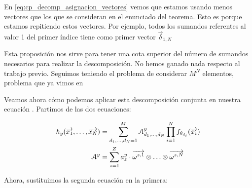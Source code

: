 \begin{observacion}
    En \eqref{eq:cp_decomp_asignacion_vectores} vemos que estamos usando menos vectores que los que se consideran en el enunciado del teorema. Esto es porque estamos repitiendo estos vectores. Por ejemplo, todos los sumandos referentes al valor 1 del primer índice tiene como primer vector $\vec{\delta}_{1, N}$
\end{observacion}

\begin{observacion}
    Esta proposición nos sirve para tener una cota superior del número de sumandos necesarios para realizar la descomposición. No hemos ganado nada respecto al trabajo previo. Seguimos teniendo el problema de considerar $M^N$ elementos, problema que ya vimos en 
\end{observacion}

Veamos ahora cómo podemos aplicar esta descomposición conjunta en nuestra ecuación . Partimos de las dos ecuaciones:

\begin{equation}
\begin{split}
    h_y(\overrightarrow{x_1}, \ldots, \overrightarrow{x_N}) &= \sum_{d_1, \ldots, d_N = 1}^{M} \mathcal{A}^y_{d_1, \ldots, d_N} \prod_{i = 1}^N f_{\theta_{d_i}}(\overrightarrow{x_i}) \\
    \mathcal{A}^y &= \sum_{z = 1}^Z a_z^y \cdot \overrightarrow{\omega^{z, 1}} \otimes \ldots \otimes \overrightarrow{\omega^{z, N}} \\
\end{split}
\end{equation}

Ahora, sustituimos la segunda ecuación en la primera:

